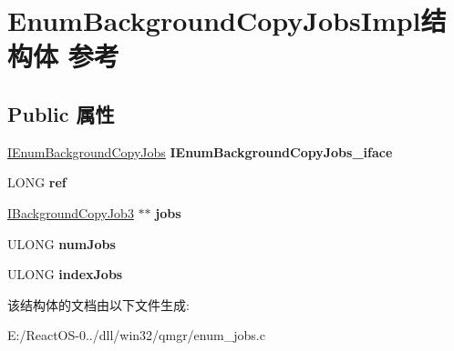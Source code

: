 \hypertarget{struct_enum_background_copy_jobs_impl}{}\section{Enum\+Background\+Copy\+Jobs\+Impl结构体 参考}
\label{struct_enum_background_copy_jobs_impl}
\subsection*{Public 属性}
\begin{DoxyCompactItemize}
\item 
\mbox{\label{struct_enum_background_copy_jobs_impl_abd1b80e301a90923236fee79bfd28baa}} 
\hyperlink{interface_i_enum_background_copy_jobs}{I\+Enum\+Background\+Copy\+Jobs} {\bfseries I\+Enum\+Background\+Copy\+Jobs\+\_\+iface}
\item 
\mbox{\label{struct_enum_background_copy_jobs_impl_a347fa66d3f2df90fc5f37e0e269b0767}} 
L\+O\+NG {\bfseries ref}
\item 
\mbox{\label{struct_enum_background_copy_jobs_impl_aa8dca56bdb84fe400c356da25e94bc18}} 
\hyperlink{interface_i_background_copy_job3}{I\+Background\+Copy\+Job3} $\ast$$\ast$ {\bfseries jobs}
\item 
\mbox{\label{struct_enum_background_copy_jobs_impl_a9a1d2019cad147ce949bee0709182dd0}} 
U\+L\+O\+NG {\bfseries num\+Jobs}
\item 
\mbox{\label{struct_enum_background_copy_jobs_impl_a103af20c3fff22ce7d96ed4e55cc1b17}} 
U\+L\+O\+NG {\bfseries index\+Jobs}
\end{DoxyCompactItemize}


该结构体的文档由以下文件生成\+:\begin{DoxyCompactItemize}
\item 
E\+:/\+React\+O\+S-\/0../dll/win32/qmgr/enum\+\_\+jobs.\+c\end{DoxyCompactItemize}
